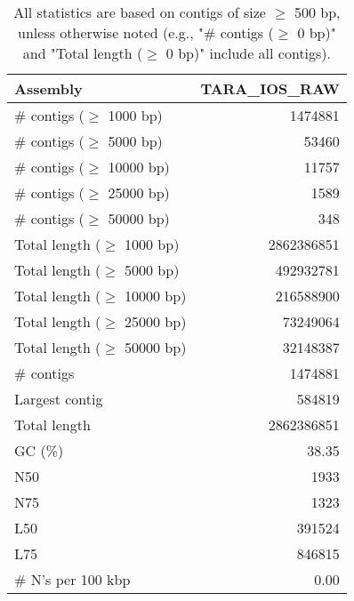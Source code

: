 \documentclass[12pt,a4paper]{article}
\begin{document}
\begin{table}[ht]
\begin{center}
\caption{All statistics are based on contigs of size $\geq$ 500 bp, unless otherwise noted (e.g., "\# contigs ($\geq$ 0 bp)" and "Total length ($\geq$ 0 bp)" include all contigs).}
\begin{tabular}{|l*{1}{|r}|}
\hline
Assembly & TARA\_IOS\_RAW \\ \hline
\# contigs ($\geq$ 1000 bp) & 1474881 \\ \hline
\# contigs ($\geq$ 5000 bp) & 53460 \\ \hline
\# contigs ($\geq$ 10000 bp) & 11757 \\ \hline
\# contigs ($\geq$ 25000 bp) & 1589 \\ \hline
\# contigs ($\geq$ 50000 bp) & 348 \\ \hline
Total length ($\geq$ 1000 bp) & 2862386851 \\ \hline
Total length ($\geq$ 5000 bp) & 492932781 \\ \hline
Total length ($\geq$ 10000 bp) & 216588900 \\ \hline
Total length ($\geq$ 25000 bp) & 73249064 \\ \hline
Total length ($\geq$ 50000 bp) & 32148387 \\ \hline
\# contigs & 1474881 \\ \hline
Largest contig & 584819 \\ \hline
Total length & 2862386851 \\ \hline
GC (\%) & 38.35 \\ \hline
N50 & 1933 \\ \hline
N75 & 1323 \\ \hline
L50 & 391524 \\ \hline
L75 & 846815 \\ \hline
\# N's per 100 kbp & 0.00 \\ \hline
\end{tabular}
\end{center}
\end{table}
\end{document}
